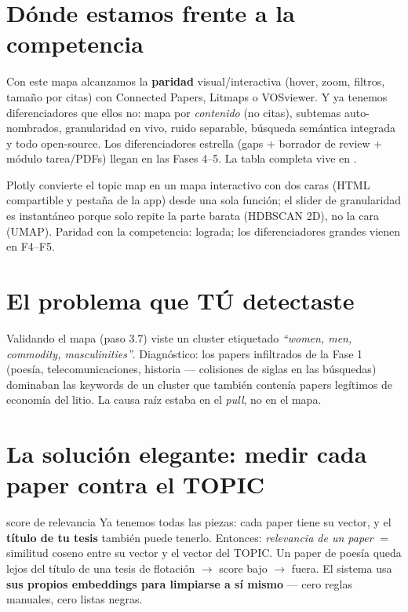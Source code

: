 \documentclass[11pt,a4paper]{article}
\begin{document}
\section{Dónde estamos frente a la competencia}

Con este mapa alcanzamos la \textbf{paridad} visual/interactiva (hover, zoom, filtros, tamaño
por citas) con Connected Papers, Litmaps o VOSviewer. Y ya tenemos diferenciadores que ellos
no: mapa por \emph{contenido} (no citas), subtemas auto-nombrados, granularidad en vivo,
ruido separable, búsqueda semántica integrada y todo open-source. Los diferenciadores
estrella (gaps + borrador de review + módulo tarea/PDFs) llegan en las Fases 4--5. La tabla
completa vive en .

\begin{resumen}
Plotly convierte el topic map en un mapa interactivo con dos caras (HTML compartible y
pestaña de la app) desde una sola función; el slider de granularidad es instantáneo porque
solo repite la parte barata (HDBSCAN 2D), no la cara (UMAP). Paridad con la competencia:
lograda; los diferenciadores grandes vienen en F4--F5.
\end{resumen}
\clearpage
{}
{}

\section{El problema que TÚ detectaste}

Validando el mapa (paso 3.7) viste un cluster etiquetado \emph{``women, men, commodity,
masculinities''}. Diagnóstico: los papers infiltrados de la Fase 1 (poesía, telecomunicaciones,
historia --- colisiones de siglas en las búsquedas) dominaban las keywords de un cluster que
también contenía papers legítimos de economía del litio. La causa raíz estaba en el
\emph{pull}, no en el mapa.

\section{La solución elegante: medir cada paper contra el TOPIC}

\begin{concepto}{score de relevancia}
Ya tenemos todas las piezas: cada paper tiene su vector, y el \textbf{título de tu tesis}
también puede tenerlo. Entonces: \emph{relevancia de un paper} $=$ similitud coseno entre su
vector y el vector del TOPIC. Un paper de poesía queda lejos del título de una tesis de
flotación $\rightarrow$ score bajo $\rightarrow$ fuera. El sistema usa \textbf{sus propios
embeddings para limpiarse a sí mismo} --- cero reglas manuales, cero listas negras.
\end{concepto}
\end{document}
